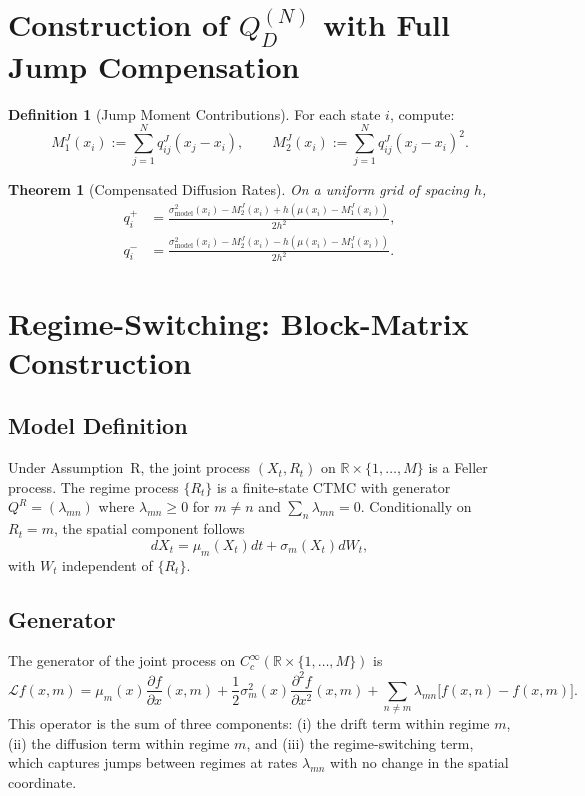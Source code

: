\documentclass[11pt,a4paper,openany]{book}
\theoremstyle{definition}
\newtheorem{definition}{Definition}[chapter]
\theoremstyle{plain}
\newtheorem{theorem}{Theorem}[chapter]
\theoremstyle{remark}
\newcommand{\1}{\mathbbm{1}}
\newcommand{\R}{\mathbb{R}}
\begin{document}
\section{Construction of $Q_{D}^{(N)}$ with Full Jump Compensation}

\begin{definition}[Jump Moment Contributions]
For each state $i$, compute:
\[
M_{1}^{J}(x_{i}) := \sum_{j=1}^{N} q_{ij}^{J} (x_{j} - x_{i}), \qquad
M_{2}^{J}(x_{i}) := \sum_{j=1}^{N} q_{ij}^{J} (x_{j} - x_{i})^{2}.
\]
\end{definition}

\begin{theorem}[Compensated Diffusion Rates]
On a uniform grid of spacing $h$,
\[
\boxed{\begin{aligned}
q_{i}^{+} &= \frac{\sigma_{\text{model}}^{2}(x_{i}) - M_{2}^{J}(x_{i}) + h(\mu(x_{i}) - M_{1}^{J}(x_{i}))}{2h^{2}}, \\[8pt]
q_{i}^{-} &= \frac{\sigma_{\text{model}}^{2}(x_{i}) - M_{2}^{J}(x_{i}) - h(\mu(x_{i}) - M_{1}^{J}(x_{i}))}{2h^{2}}.
\end{aligned}}
\]
\end{theorem}

\section{Regime-Switching: Block-Matrix Construction}

\subsection{Model Definition}

Under Assumption~R, the joint process $(X_{t}, R_{t})$ on $\R \times \{1,\ldots,M\}$ is a Feller process. The regime process $\{R_{t}\}$ is a finite-state CTMC with generator $Q^{R} = (\lambda_{mn})$ where $\lambda_{mn} \geq 0$ for $m \neq n$ and $\sum_{n} \lambda_{mn} = 0$. Conditionally on $R_{t} = m$, the spatial component follows
\[
dX_{t} = \mu_{m}(X_{t}) dt + \sigma_{m}(X_{t}) dW_{t},
\]
with $W_{t}$ independent of $\{R_{t}\}$.

\subsection{Generator}

The generator of the joint process on $C_{c}^{\infty}(\R \times \{1,\ldots,M\})$ is
\[
\boxed{\mathcal{L} f(x, m) = \mu_{m}(x) \frac{\partial f}{\partial x}(x,m) + \frac{1}{2} \sigma_{m}^{2}(x) \frac{\partial^{2} f}{\partial x^{2}}(x,m) + \sum_{n \neq m} \lambda_{mn} \bigl[f(x,n) - f(x,m)\bigr]}.
\]
This operator is the sum of three components: (i) the drift term within regime $m$, (ii) the diffusion term within regime $m$, and (iii) the regime-switching term, which captures jumps between regimes at rates $\lambda_{mn}$ with no change in the spatial coordinate.
\end{document}
